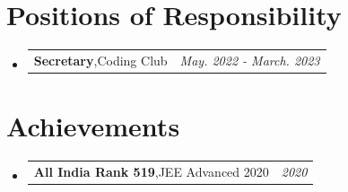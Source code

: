 \documentclass[a4paper,11pt]{article}
\makeatletter
\newcommand{\resumePOR}[3]{
\vspace{0.5mm}\item
    \begin{tabular*}{0.97\textwidth}[t]{l@{\extracolsep{\fill}}r}
        \textbf{#1},\hspace{0.3mm}#2 & \textit{\small{#3}} 
    \end{tabular*}
    \vspace{-2mm}
}
\newcommand{\resumeSubHeadingListStart}{\begin{itemize}[leftmargin=*,labelsep=0mm]}
\newcommand{\resumeSubHeadingListEnd}{\end{itemize}\vspace{2mm}}
\makeatother
\begin{document}
\section{Positions of Responsibility}
\vspace{-0.4mm}
\resumeSubHeadingListStart
 \resumePOR{Secretary}
{Coding Club}
{May. 2022 - March. 2023}
\resumeSubHeadingListEnd
\vspace{-4mm}\section{Achievements}
\vspace{-0.4mm}
\resumeSubHeadingListStart
 \resumePOR{All India Rank 519}
{JEE Advanced 2020}
{2020}
\resumeSubHeadingListEnd
\vspace{-4mm}
\end{document}
